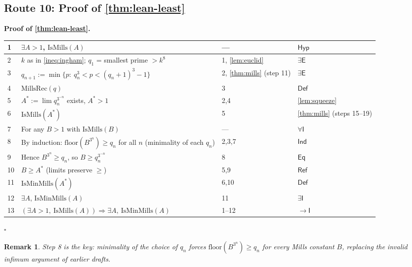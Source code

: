 \documentclass[11pt,reqno]{amsart}
\theoremstyle{blueplain}
\newtheorem{remark}{Remark}[section]
\renewcommand{\qedsymbol}{\textcolor{proofqed}{\ensuremath{\square}}}
\renewenvironment{proof}[1][Proof]{\par\noindent\textbf{\textcolor{proofhead}{#1.}}\par\nobreak}{\par\nobreak\hfill\qedsymbol}
\numberwithin{equation}{section}
\begin{document}
\subsection{Route 10: Proof of \cref{thm:lean-least}}

\begin{proof}[\textbf{Proof of \cref{thm:lean-least}}]
	\label{proof:lean-least}
	{\scriptsize
		\begin{tabular}{|m{0.7cm}|m{12cm}|m{1.4cm}|m{2.5cm}|}
			\hline
			1 & $\exists A>1$, $\mathrm{IsMills}(A)$ & --- & $\mathsf{Hyp}$ \\ \hline
			2 & $k$ as in \cref{ineq:ingham}; $q_1$ = smallest prime $>k^{8}$ & 1, \cref{lem:euclid} & $\exists\mathsf{E}$ \\ \hline
			3 & $q_{n+1}:=\min\{p:\ q_n^{3}<p<(q_n+1)^{3}-1\}$ & 2, \cref{thm:mills} (step 11) & $\exists\mathsf{E}$ \\ \hline
			4 & $\mathrm{MillsRec}(q)$ & 3 & $\mathsf{Def}$ \\ \hline
			5 & $A^*:=\lim q_n^{3^{-n}}$ exists, $A^*>1$ & 2,4 & \cref{lem:squeeze} \\ \hline
			6 & $\mathrm{IsMills}(A^*)$ & 5 & \cref{thm:mills} (steps 15–19) \\ \hline
			7 & For any $B>1$ with $\mathrm{IsMills}(B)$ & --- & $\forall\mathsf{I}$ \\ \hline
			8 & By induction: $\mathrm{floor}(B^{3^{n}})\ge q_n$ for all $n$ (minimality of each $q_n$) & 2,3,7 & $\mathsf{Ind}$ \\ \hline
			9 & Hence $B^{3^{n}}\ge q_n$, so $B\ge q_n^{3^{-n}}$ & 8 & $\mathsf{Eq}$ \\ \hline
			10 & $B\ge A^*$ (limits preserve $\ge$) & 5,9 & $\mathsf{Ref}$ \\ \hline
			11 & $\mathrm{IsMinMills}(A^*)$ & 6,10 & $\mathsf{Def}$ \\ \hline
			12 & $\exists A$, $\mathrm{IsMinMills}(A)$ & 11 & $\exists\mathsf{I}$ \\ \hline
			13 & $(\exists A>1,\ \mathrm{IsMills}(A))\Rightarrow\exists A,\ \mathrm{IsMinMills}(A)$ & 1--12 & $\rightarrow\mathsf{I}$ \\ \hline
		\end{tabular}
	}
\end{proof}

\begin{remark}
	{\scriptsize Step 8 is the key: minimality of the choice of $q_n$ forces $\mathrm{floor}(B^{3^{n}})\ge q_n$ for \emph{every} Mills constant $B$, replacing the invalid infimum argument of earlier drafts. }
\end{remark}
\end{document}
